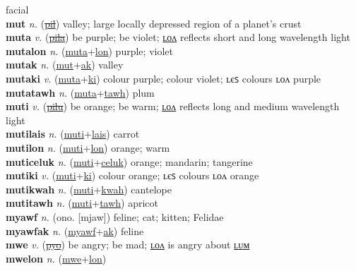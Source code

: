 facial \label{mukak} \\
\textbf{mut} \textit{n.} (\hyperref[pil]{\sout{pil}})
valley; large locally depressed region of a planet’s crust \label{mut} \\
\textbf{muta} \textit{v.} (\hyperref[pila]{\sout{pila}})
be purple; be violet; \hyperref[mutalon]{ʟᴏᴧ} reflects short and long wavelength light \label{muta} \\
\textbf{mutalon} \textit{n.} (\hyperref[muta]{muta}+\hyperref[lon]{lon})
purple; violet \label{mutalon} \\
\textbf{mutak} \textit{n.} (\hyperref[mut]{mut}+\hyperref[ak]{ak})
valley \label{mutak} \\
\textbf{mutaki} \textit{v.} (\hyperref[muta]{muta}+\hyperref[ki]{ki})
colour purple; colour violet; ʟєꜱ colours ʟᴏᴧ purple \label{mutaki} \\
\textbf{mutatawh} \textit{n.} (\hyperref[muta]{muta}+\hyperref[tawh]{tawh})
plum \label{mutatawh} \\
\textbf{muti} \textit{v.} (\hyperref[pilu]{\sout{pilu}})
be orange; be warm; \hyperref[mutilon]{ʟᴏᴧ} reflects long and medium wavelength light \label{muti} \\
\textbf{mutilais} \textit{n.} (\hyperref[muti]{muti}+\hyperref[lais]{lais})
carrot \label{mutilais} \\
\textbf{mutilon} \textit{n.} (\hyperref[muti]{muti}+\hyperref[lon]{lon})
orange; warm \label{mutilon} \\
\textbf{muticeluk} \textit{n.} (\hyperref[muti]{muti}+\hyperref[celuk]{celuk})
orange; mandarin; tangerine \label{muticeluk} \\
\textbf{mutiki} \textit{v.} (\hyperref[muti]{muti}+\hyperref[ki]{ki})
colour orange; ʟєꜱ colours ʟᴏᴧ orange \label{mutiki} \\
\textbf{mutikwah} \textit{n.} (\hyperref[muti]{muti}+\hyperref[kwah]{kwah})
cantelope \label{mutikwah} \\
\textbf{mutitawh} \textit{n.} (\hyperref[muti]{muti}+\hyperref[tawh]{tawh})
apricot \label{mutitawh} \\
\textbf{myawf} \textit{n.} (ono. [mjaw])
feline; cat; kitten; Felidae \label{myawf} \\
\textbf{myawfak} \textit{n.} (\hyperref[myawf]{myawf}+\hyperref[ak]{ak})
feline \label{myawfak} \\
\textbf{mwe} \textit{v.} (\hyperref[pyo]{\sout{pyo}})
be angry; be mad; \hyperref[mwelon]{ʟᴏᴧ} is angry about \hyperref[mwelum]{ʟᴜᴍ} \label{mwe} \\
\textbf{mwelon} \textit{n.} (\hyperref[mwe]{mwe}+\hyperref[lon]{lon})
